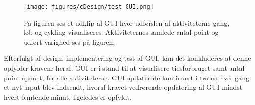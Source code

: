 \begin{figure}[H]
	\centering
	\texttt{[image: figures/cDesign/test\_GUI.png]}
	\caption{På figuren ses et udklip af GUI hvor udførslen af aktiviteterne gang, løb og cykling visualiseres. Aktiviteternes samlede antal point og udført varighed ses på figuren.}
	\label{fig:GUI}
\end{figure}

Efterfulgt af design, implementering og test af GUI, kan det konkluderes at denne opfylder kravene heraf. GUI er i stand til at visualisere tidsforbruget samt antal point opnået, for alle aktiviteterne. GUI opdaterede kontinuert i testen hver gang et nyt input blev indsendt, hvoraf kravet vedrørende opdatering af GUI mindst hvert femtende minut, ligeledes er opfyldt.